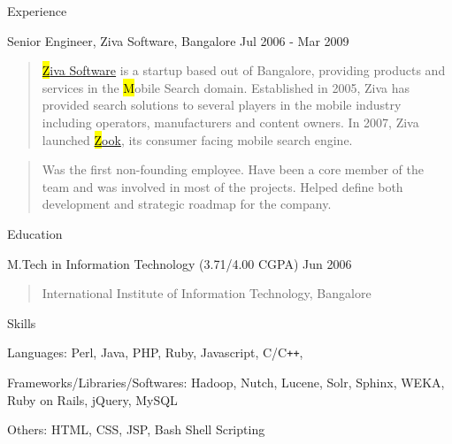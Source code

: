 \documentclass{resume}
\author{Siddhartha Reddy Kothakapu}
\begin{document}
 \maketitle


\begin{category}{Experience}{}

    \item {\topic Senior Engineer,} Ziva Software, Bangalore
        {\period Jul 2006 - Mar 2009}
        \begin{quote}
            \href{http://www.zook.in/}{{\hl Ziva Software}} is a 
            startup based out of Bangalore, providing products and services in the
            {\hl Mobile Search} domain.  Established in 2005, Ziva has
            provided search solutions to several players in the mobile industry
            including operators, manufacturers and content owners. In 2007, Ziva launched
            \href{http://www.zook.in/}{{\hl Zook}}, its consumer facing mobile
            search engine.
        \end{quote}
        \begin{quote}
            Was the first non-founding employee. Have been a core
            member of the team and was involved in most of the projects. Helped
            define both development and strategic roadmap for the company.
        \end{quote}

\end{category}


\begin{category}{Education}{}

    \item {\topic M.Tech in Information Technology}
        {\footnotesize(3.71/4.00 CGPA)}
        {\period Jun 2006}
        \begin{quote}
            International Institute of Information Technology, Bangalore
        \end{quote}

\end{category}


\begin{category}{Skills}{}

    \item {\topic Languages:} Perl, Java, PHP, Ruby, Javascript, C/C{\tt ++},

    \item {\topic Frameworks/Libraries/Softwares:} Hadoop, Nutch, Lucene, Solr,
        Sphinx, WEKA, Ruby on Rails, jQuery, MySQL

    \item {\topic Others:} HTML, CSS, JSP, Bash Shell Scripting

\end{category}
\end{document}
